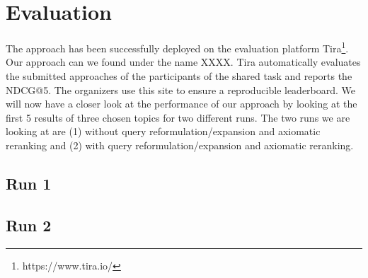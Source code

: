\section{Evaluation}
    The approach has been successfully deployed on the evaluation platform Tira\footnote{https://www.tira.io/}. Our approach can we found under the name XXXX. Tira automatically evaluates the submitted approaches of the participants of the shared task and reports the NDCG@5. The organizers use this site to ensure a reproducible leaderboard. We will now have a closer look at the performance of our approach by looking at the first 5 results of three chosen topics for two different runs. The two runs we are looking at are (1) without query reformulation/expansion and axiomatic reranking and (2) with query reformulation/expansion and axiomatic reranking.
    \subsection{Run 1}
        
    \subsection{Run 2}